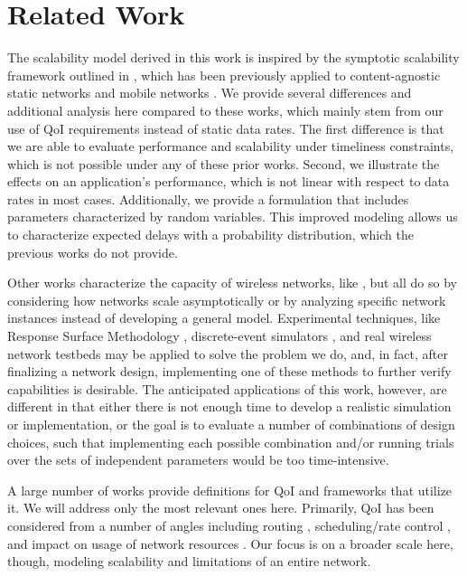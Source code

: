 \section{Related Work}
\label{sec:related_work}

The scalability model derived in this work is inspired by the symptotic scalability framework outlined in \cite{symptotics_journal}, which has been previously applied to content-agnostic static networks \cite{symptotics_framework_scalability} and mobile networks \cite{scal_analysis_mobility}. We provide several differences and additional analysis here compared to these works, which mainly stem from our use of QoI requirements instead of static data rates. The first difference is that we are able to evaluate performance and scalability under timeliness constraints, which is not possible under any of these prior works. Second, we illustrate the effects on an application's performance, which is not linear with respect to data rates in most cases. Additionally, we provide a formulation that includes parameters characterized by random variables. This improved modeling allows us to characterize expected delays with a probability distribution, which the previous works do not provide. 

Other works characterize the capacity of wireless networks, like \cite{li_capacity, gupta2000capacity}, but all do so by considering how networks scale asymptotically or by analyzing specific network instances instead of developing a general model. Experimental techniques, like Response Surface Methodology \cite{khuri2010response}, discrete-event simulators \cite{ns3}, and real wireless network testbeds \cite{iot_lab_exp_platform, wsn_testbed, wisebed} may be applied to solve the problem we do, and, in fact, after finalizing a network design, implementing one of these methods to further verify capabilities is desirable. The anticipated applications of this work, however, are different in that either there is not enough time to develop a realistic simulation or implementation, or the goal is to evaluate a number of combinations of design choices, such that implementing each possible combination and/or running trials over the sets of independent parameters would be too time-intensive. 

A large number of works provide definitions for QoI and frameworks that utilize it.  We will address only the most relevant ones here.  Primarily, QoI has been considered from a number of angles including routing \cite{quality_aware_routing_tan}, scheduling/rate control \cite{toward_qoi_rate_control,explor_vs_exploit}, and impact on usage of network resources \cite{qoi_aware_mobile_apps}. Our focus is on a broader scale here, though, modeling scalability and limitations of an entire network.  

